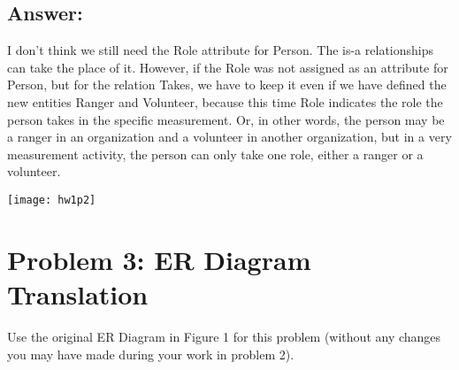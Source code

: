 \documentclass[letter,11pt]{article}
\begin{document}
\begin{enumerate}
\subsection*{Answer:} I don't think we still need the Role attribute for Person. The is-a relationships can take the place of it. However, if the Role was not assigned as an attribute for Person, but for the relation Takes, we have to keep it even if we have defined the new entities Ranger and Volunteer, because this time Role indicates the role the person takes in the specific measurement. Or, in other words, the person may be a ranger in an organization and a volunteer in another organization, but in a very measurement activity, the person can only take one role, either a ranger or a volunteer.

\texttt{[image: hw1p2]}

\end{enumerate}

\section*{Problem 3: ER Diagram Translation}

Use the original ER Diagram in Figure 1 for this problem (without any changes you may have made during your work in problem 2).
\end{document}
